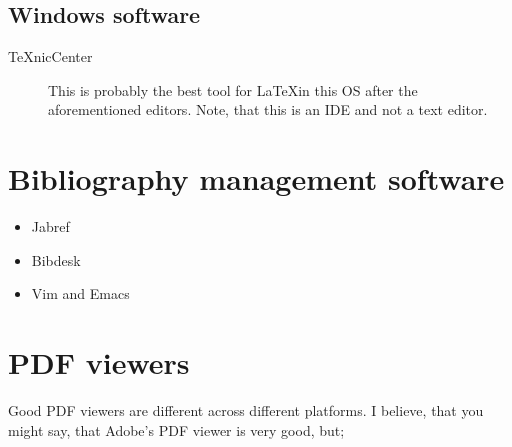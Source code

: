\documentclass[a4paper]{article}
\begin{document}
\subsection{Windows software}

\begin{description}
    \item[TeXnicCenter] This is probably the best tool for \LaTeX in this OS
        after the aforementioned editors. Note, that this is an IDE and not a
        text editor.
\end{description}

\section{Bibliography management software}

\begin{itemize}
    \item Jabref
    \item Bibdesk
    \item Vim and Emacs
\end{itemize}

\section{PDF viewers}

Good PDF viewers are different across different platforms. I believe, that you
might say, that Adobe's PDF viewer is very good, but;
\end{document}
